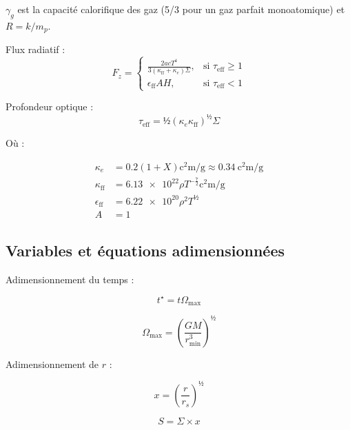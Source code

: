$\gamma_g$ est la capacité calorifique des gaz (\num{5/3} pour un gaz parfait monoatomique) et $R = k / m_p$.

Flux radiatif :
\begin{equation}
    F_z =
    \begin{cases}
        \frac{2 a c T^4}{3 (\kappa_\mathrm{ff} + \kappa_e)\Sigma}, &\text{si $\tau_\mathrm{eff} \geq 1$} \\
        \epsilon_\mathrm{ff} A H, &\text{si $\tau_\mathrm{eff} < 1$}
    \end{cases}
\end{equation}

Profondeur optique :
\begin{equation}
    \tau_\mathrm{eff} = ½ (\kappa_e \kappa_\mathrm{ff})^½ \Sigma
\end{equation}

Où :

\begin{align}
    \kappa_e &= \num{0.2} (1+X) \si{\square\centi\meter\per\gram} \approx \SI{0.34}{\square\centi\meter\per\gram} \\
    \kappa_\mathrm{ff} &= \num{6.13e22} \rho T^{-\frac{7}{2}} \si{\square\centi\meter\per\gram}\\
    \epsilon_\mathrm{ff} &= \num{6.22e20} \rho^2 T^½ \\
    A &= 1
\end{align}

\subsection{Variables et équations adimensionnées}

Adimensionnement du temps :

\begin{equation}
    t^\star = t \Omega_\mathrm{max}
\end{equation}

\begin{equation}
    \Omega_\mathrm{max} = \left( \frac{G M}{r^3_\mathrm{min}} \right)^½
\end{equation}

Adimensionnement de $r$ :

\begin{equation}
    x = \left( \frac{r}{r_s} \right)^½
\end{equation}

\begin{equation}
    S = \Sigma × x
\end{equation}

